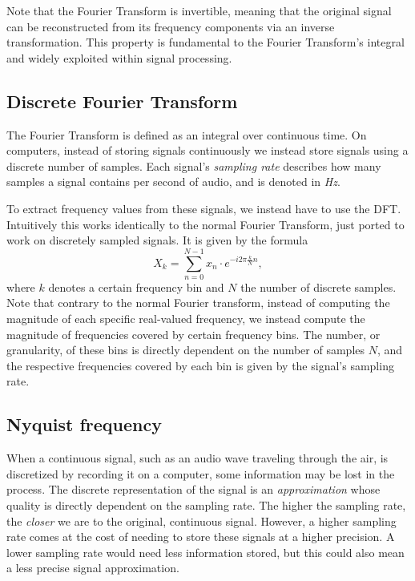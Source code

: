 Note that the Fourier Transform is invertible, meaning that the original signal can be reconstructed from its frequency components via an inverse transformation. This property is fundamental to the Fourier Transform's integral and widely exploited within signal processing.

\subsection{Discrete Fourier Transform}

The Fourier Transform is defined as an integral over continuous time. On computers, instead of storing signals continuously we instead store signals using a discrete number of samples. Each signal's \textit{sampling rate} describes how many samples a signal contains per second of audio, and is denoted in \textit{Hz}.

To extract frequency values from these signals, we instead have to use the \gls{DFT}. Intuitively this works identically to the normal Fourier Transform, just ported to work on discretely sampled signals. It is given by the formula \[ X_k = \sum^{N - 1}_{n=0}{x_n \cdot e^{-i 2\pi \frac{k}{N} n}}, \] where $k$ denotes a certain frequency bin and $N$ the number of discrete samples. Note that contrary to the normal Fourier transform, instead of computing the magnitude of each specific real-valued frequency, we instead compute the magnitude of frequencies covered by certain frequency bins. The number, or granularity, of these bins is directly dependent on the number of samples $N$, and the respective frequencies covered by each bin is given by the signal's sampling rate.

\subsection{Nyquist frequency}

When a continuous signal, such as an audio wave traveling through the air, is discretized by recording it on a computer, some information may be lost in the process. The discrete representation of the signal is an \textit{approximation} whose quality is directly dependent on the sampling rate. The higher the sampling rate, the \textit{closer} we are to the original, continuous signal. However, a higher sampling rate comes at the cost of needing to store these signals at a higher precision. A lower sampling rate would need less information stored, but this could also mean a less precise signal approximation.

